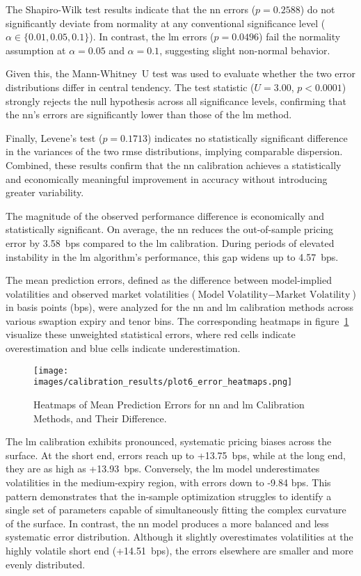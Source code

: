 The Shapiro-Wilk test results indicate that the \ac{nn} errors (\(p=0.2588\)) do not significantly deviate from normality at any conventional significance level (\(\alpha \in \{0.01, 0.05, 0.1\}\)). In contrast, the \ac{lm} errors (\(p=0.0496\)) fail the normality assumption at \(\alpha=0.05\) and \(\alpha=0.1\), suggesting slight non-normal behavior.

Given this, the Mann-Whitney~U test was used to evaluate whether the two error distributions differ in central tendency. The test statistic (\(U=3.00\), \(p<0.0001\)) strongly rejects the null hypothesis across all significance levels, confirming that the \ac{nn}'s errors are significantly lower than those of the \ac{lm} method.

Finally, Levene's test (\(p=0.1713\)) indicates no statistically significant difference in the variances of the two \ac{rmse} distributions, implying comparable dispersion. Combined, these results confirm that the \ac{nn} calibration achieves a statistically and economically meaningful improvement in accuracy without introducing greater variability.

The magnitude of the observed performance difference is economically and statistically significant. On average, the \ac{nn} reduces the out-of-sample pricing error by 3.58~\ac{bps} compared to the \ac{lm} calibration. During periods of elevated instability in the \ac{lm} algorithm's performance, this gap widens up to 4.57~\ac{bps}.

The mean prediction errors, defined as the difference between model-implied volatilities and observed market volatilities (\(\text{Model Volatility} - \text{Market Volatility}\)) in basis points (\ac{bps}), were analyzed for the \ac{nn} and \ac{lm} calibration methods across various swaption expiry and tenor bins. The corresponding heatmaps in figure~\ref{fig:error_heatmaps} visualize these unweighted statistical errors, where red cells indicate overestimation and blue cells indicate underestimation.

\begin{figure}[H]
	\centering
	\texttt{[image: images/calibration\_results/plot6\_error\_heatmaps.png]}
	\caption{Heatmaps of Mean Prediction Errors for \ac{nn} and \ac{lm} Calibration Methods, and Their Difference.}
	\label{fig:error_heatmaps}
\end{figure}

The \ac{lm} calibration exhibits pronounced, systematic pricing biases across the surface. At the short end, errors reach up to +13.75~\ac{bps}, while at the long end, they are as high as +13.93~\ac{bps}. Conversely, the \ac{lm} model underestimates volatilities in the medium-expiry region, with errors down to -9.84 \ac{bps}. This pattern demonstrates that the in-sample optimization struggles to identify a single set of parameters capable of simultaneously fitting the complex curvature of the surface. In contrast, the \ac{nn} model produces a more balanced and less systematic error distribution. Although it slightly overestimates volatilities at the highly volatile short end (+14.51~\ac{bps}), the errors elsewhere are smaller and more evenly distributed.

